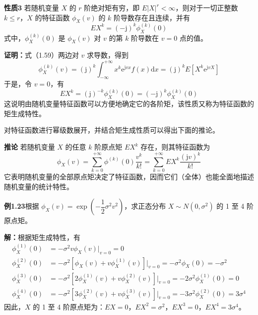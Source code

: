 \documentclass[11pt,openany,UTF8]{ctexbook}
\newcommand{\dif}{\mathrm{d}}                      %
\newcommand{\eu}{\mathrm{e}}                       %
\newcommand{\ju}{\mathrm{j}}                       %
\newcommand{\thm}[1]{\par\medskip\noindent\textbf{#1}\quad}
\begin{document}
\thm{性质3} 若随机变量 $X$ 的 $r$ 阶绝对矩有穷\nobreak，即 $E\lvert X\rvert^r<\infty$\nobreak，则对于一切正整数 $k\leqslant r$\nobreak，$X$ 的特征函数 $\phi_X(v)$ 的 $k$ 阶导数存在且连续\nobreak，并有
\begin{equation}
EX^k=(-\ju)^k\phi_X^{(k)}(0)
\label{eq:1.64}
\end{equation}
式中\nobreak，$\phi_X^{(k)}(0)$ 是 $\phi_X(v)$ 对 $v$ 的第 $k$ 阶导数在 $v=0$ 点的值\nobreak。

\textbf{证明\nobreak：}式（1.59\nobreak）两边对 $v$ 求导数\nobreak，得到
\[
\phi_X^{(k)}(v)=(\ju)^k\int_{-\infty}^{+\infty}x^k\eu^{\ju vx}f(x)\dif x
=(\ju)^k E\left[X^k\eu^{\ju vX}\right]
\]
于是\nobreak，令 $v=0$\nobreak，有
\[
EX^k=(\ju)^{-k}\phi_X^{(k)}(0)=(-\ju)^k\phi_X^{(k)}(0)
\]
这说明由随机变量特征函数可以方便地确定它的各阶矩\nobreak，该性质又称为特征函数的矩生成特性\nobreak。

对特征函数进行幂级数展开\nobreak，并结合矩生成性质可以得出下面的推论\nobreak。

\thm{推论} 若随机变量 $X$ 的任意 $k$ 阶原点矩 $EX^k$ 存在\nobreak，则其特征函数为
\begin{equation}
\phi_X(v)=\sum_{k=0}^{+\infty}\phi^{(k)}(0)\frac{v^k}{k!}
=\sum_{k=0}^{+\infty}EX^k\frac{(\ju v)^k}{k!}
\label{eq:1.65}
\end{equation}
它表明随机变量的全部原点矩决定了特征函数\nobreak，因而它们（全体\nobreak）也能全面地描述随机变量的统计特性\nobreak。

\begin{examplebox}
\textbf{例1.23}\quad 根据 $\phi_X(v)=\exp\left(-\dfrac{1}{2}\sigma^2v^2\right)$\nobreak，求正态分布 $X\sim N(0,\sigma^2)$ 的 1 至 4 阶原点矩\nobreak。

\textbf{解\nobreak：}根据矩生成特性\nobreak，有
\[
\begin{aligned}
\phi_X^{(1)}(0)&=-\sigma^2 v\phi_X(v)\big|_{v=0}=0\\[2pt]
\phi_X^{(2)}(0)&=-\sigma^2\left[\phi_X(v)+v\phi_X^{(1)}(v)\right]\Big|_{v=0}
                =-\sigma^2\phi_X(0)=-\sigma^2\\[2pt]
\phi_X^{(3)}(0)&=-\sigma^2\left[2\phi_X^{(1)}(v)+v\phi_X^{(2)}(v)\right]\Big|_{v=0}
                =-2\sigma^2\phi_X^{(1)}(0)=0\\[2pt]
\phi_X^{(4)}(0)&=-\sigma^2\left[3\phi_X^{(2)}(v)+v\phi_X^{(3)}(v)\right]\Big|_{v=0}
                =-3\sigma^2\phi_X^{(2)}(0)=3\sigma^4
\end{aligned}
\]
因此\nobreak，$X$ 的 1 至 4 阶原点矩为\nobreak：$EX=0$\nobreak，$EX^2=\sigma^2$\nobreak，$EX^3=0$\nobreak，$EX^4=3\sigma^4$\nobreak。
\end{examplebox}
\end{document}
